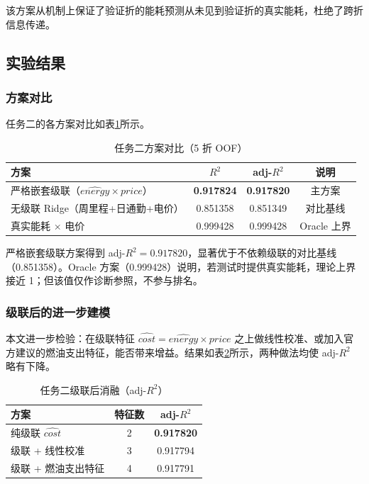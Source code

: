 该方案从机制上保证了验证折的能耗预测从未见到验证折的真实能耗，杜绝了跨折信息传递。

\subsection{实验结果}

\subsubsection{方案对比}

任务二的各方案对比如表\ref{tab:t2_results}所示。

\begin{table}[H]
\centering
\caption{任务二方案对比（5 折 OOF）}
\label{tab:t2_results}
\begin{tabular}{lccc}
\toprule
\textbf{方案} & \textbf{$R^2$} & \textbf{adj-$R^2$} & \textbf{说明} \\
\midrule
严格嵌套级联（$\hat{energy}\times price$） & \textbf{0.917824} & \textbf{0.917820} & 主方案 \\
无级联 Ridge（周里程+日通勤+电价） & 0.851358 & 0.851349 & 对比基线 \\
真实能耗 $\times$ 电价 & 0.999428 & 0.999428 & Oracle 上界 \\
\bottomrule
\end{tabular}
\end{table}

严格嵌套级联方案得到 adj-$R^2=0.917820$，显著优于不依赖级联的对比基线（0.851358）。Oracle 方案（0.999428）说明，若测试时提供真实能耗，理论上界接近 1；但该值仅作诊断参照，不参与排名。

\subsubsection{级联后的进一步建模}

本文进一步检验：在级联特征 $\hat{cost} = \hat{energy} \times price$ 之上做线性校准、或加入官方建议的燃油支出特征，能否带来增益。结果如表\ref{tab:t2_ablation}所示，两种做法均使 adj-$R^2$ 略有下降。

\begin{table}[H]
\centering
\caption{任务二级联后消融（adj-$R^2$）}
\label{tab:t2_ablation}
\begin{tabular}{lcc}
\toprule
\textbf{方案} & \textbf{特征数} & \textbf{adj-$R^2$} \\
\midrule
纯级联 $\hat{cost}$ & 2 & \textbf{0.917820} \\
级联 + 线性校准 & 3 & 0.917794 \\
级联 + 燃油支出特征 & 4 & 0.917791 \\
\bottomrule
\end{tabular}
\end{table}


